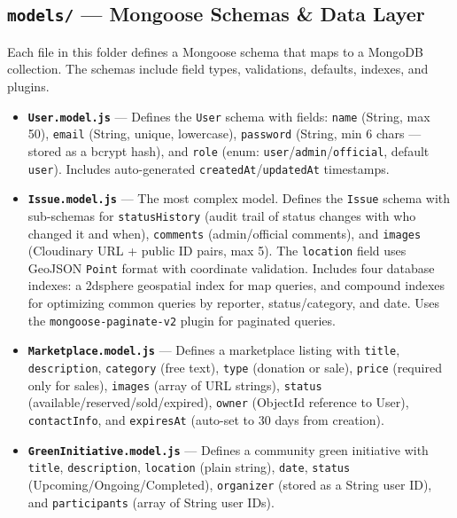 \documentclass[12pt,a4paper]{article}
\begin{document}
\subsection{\texttt{models/} --- Mongoose Schemas \& Data Layer}

Each file in this folder defines a Mongoose schema that maps to a MongoDB collection. The schemas include field types, validations, defaults, indexes, and plugins.

\begin{itemize}[leftmargin=1cm]
  \item \textbf{\texttt{User.model.js}} --- Defines the \texttt{User} schema with fields: \texttt{name} (String, max 50), \texttt{email} (String, unique, lowercase), \texttt{password} (String, min 6 chars --- stored as a bcrypt hash), and \texttt{role} (enum: \texttt{user}/\texttt{admin}/\texttt{official}, default \texttt{user}). Includes auto-generated \texttt{createdAt}/\texttt{updatedAt} timestamps.

  \item \textbf{\texttt{Issue.model.js}} --- The most complex model. Defines the \texttt{Issue} schema with sub-schemas for \texttt{statusHistory} (audit trail of status changes with who changed it and when), \texttt{comments} (admin/official comments), and \texttt{images} (Cloudinary URL + public ID pairs, max 5). The \texttt{location} field uses GeoJSON \texttt{Point} format with coordinate validation. Includes four database indexes: a 2dsphere geospatial index for map queries, and compound indexes for optimizing common queries by reporter, status/category, and date. Uses the \texttt{mongoose-paginate-v2} plugin for paginated queries.

  \item \textbf{\texttt{Marketplace.model.js}} --- Defines a marketplace listing with \texttt{title}, \texttt{description}, \texttt{category} (free text), \texttt{type} (donation or sale), \texttt{price} (required only for sales), \texttt{images} (array of URL strings), \texttt{status} (available/reserved/sold/expired), \texttt{owner} (ObjectId reference to User), \texttt{contactInfo}, and \texttt{expiresAt} (auto-set to 30 days from creation).

  \item \textbf{\texttt{GreenInitiative.model.js}} --- Defines a community green initiative with \texttt{title}, \texttt{description}, \texttt{location} (plain string), \texttt{date}, \texttt{status} (Upcoming/Ongoing/Completed), \texttt{organizer} (stored as a String user ID), and \texttt{participants} (array of String user IDs).


\end{itemize}
\end{document}
